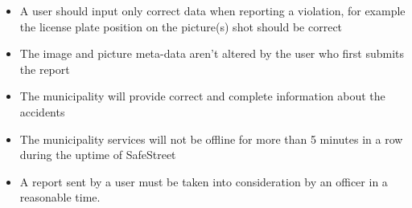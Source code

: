\begin{itemize}

\item A user should input only correct data when reporting a violation, for example the license plate position on the picture(s) shot should be correct

\item The image and picture meta-data aren't altered by the user who first submits the report

\item The municipality will provide correct and complete information 
about the accidents

\item The municipality services will not be offline for more than 5 minutes in a row during the uptime of SafeStreet
\item A report sent by a user must be taken into consideration by an officer in a reasonable time.

\end{itemize}